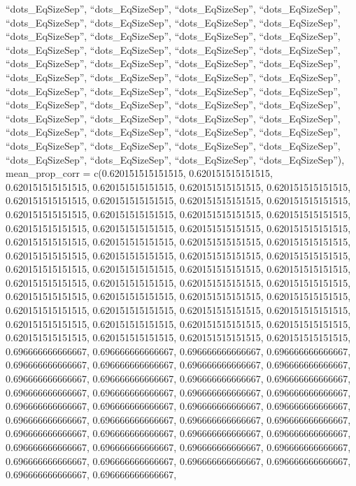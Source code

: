 \documentclass[
  man,floatsintext]{apa6}
\begin{document}
``dots\_EqSizeSep'', ``dots\_EqSizeSep'', ``dots\_EqSizeSep'', ``dots\_EqSizeSep'', ``dots\_EqSizeSep'', ``dots\_EqSizeSep'', ``dots\_EqSizeSep'', ``dots\_EqSizeSep'', ``dots\_EqSizeSep'', ``dots\_EqSizeSep'', ``dots\_EqSizeSep'', ``dots\_EqSizeSep'', ``dots\_EqSizeSep'', ``dots\_EqSizeSep'', ``dots\_EqSizeSep'', ``dots\_EqSizeSep'', ``dots\_EqSizeSep'', ``dots\_EqSizeSep'', ``dots\_EqSizeSep'', ``dots\_EqSizeSep'', ``dots\_EqSizeSep'', ``dots\_EqSizeSep'', ``dots\_EqSizeSep'', ``dots\_EqSizeSep'', ``dots\_EqSizeSep'', ``dots\_EqSizeSep'', ``dots\_EqSizeSep'', ``dots\_EqSizeSep'',
``dots\_EqSizeSep'', ``dots\_EqSizeSep'', ``dots\_EqSizeSep'', ``dots\_EqSizeSep'', ``dots\_EqSizeSep'', ``dots\_EqSizeSep'', ``dots\_EqSizeSep'', ``dots\_EqSizeSep'', ``dots\_EqSizeSep'', ``dots\_EqSizeSep'', ``dots\_EqSizeSep'', ``dots\_EqSizeSep'', ``dots\_EqSizeSep'', ``dots\_EqSizeSep'', ``dots\_EqSizeSep'', ``dots\_EqSizeSep'', ``dots\_EqSizeSep'', ``dots\_EqSizeSep'', ``dots\_EqSizeSep'', ``dots\_EqSizeSep''), mean\_prop\_corr = c(0.620151515151515, 0.620151515151515, 0.620151515151515, 0.620151515151515, 0.620151515151515, 0.620151515151515, 0.620151515151515,
0.620151515151515, 0.620151515151515, 0.620151515151515, 0.620151515151515, 0.620151515151515, 0.620151515151515, 0.620151515151515, 0.620151515151515, 0.620151515151515, 0.620151515151515, 0.620151515151515, 0.620151515151515, 0.620151515151515, 0.620151515151515, 0.620151515151515, 0.620151515151515, 0.620151515151515, 0.620151515151515, 0.620151515151515, 0.620151515151515, 0.620151515151515, 0.620151515151515, 0.620151515151515, 0.620151515151515, 0.620151515151515, 0.620151515151515, 0.620151515151515,
0.620151515151515, 0.620151515151515, 0.620151515151515, 0.620151515151515, 0.620151515151515, 0.620151515151515, 0.620151515151515, 0.620151515151515, 0.620151515151515, 0.620151515151515, 0.620151515151515, 0.620151515151515, 0.620151515151515, 0.620151515151515, 0.620151515151515, 0.620151515151515, 0.696666666666667, 0.696666666666667, 0.696666666666667, 0.696666666666667, 0.696666666666667, 0.696666666666667, 0.696666666666667, 0.696666666666667, 0.696666666666667, 0.696666666666667, 0.696666666666667,
0.696666666666667, 0.696666666666667, 0.696666666666667, 0.696666666666667, 0.696666666666667, 0.696666666666667, 0.696666666666667, 0.696666666666667, 0.696666666666667, 0.696666666666667, 0.696666666666667, 0.696666666666667, 0.696666666666667, 0.696666666666667, 0.696666666666667, 0.696666666666667, 0.696666666666667, 0.696666666666667, 0.696666666666667, 0.696666666666667, 0.696666666666667, 0.696666666666667, 0.696666666666667, 0.696666666666667, 0.696666666666667, 0.696666666666667, 0.696666666666667,
\end{document}
